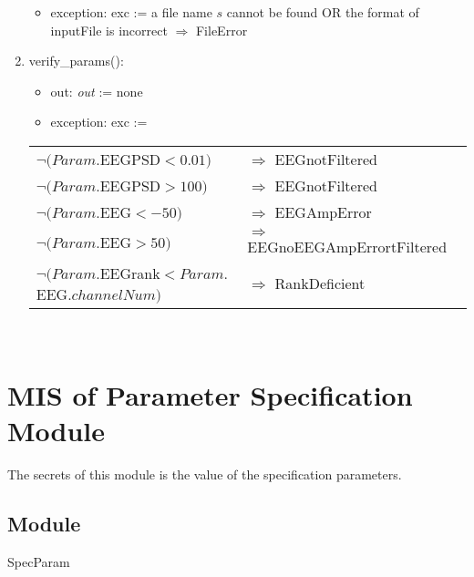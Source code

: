 \documentclass[12pt, titlepage]{article}
\begin{document}
\begin{enumerate}
\begin{itemize}
\item exception: exc := a file name $s$ cannot be found OR the format of
  inputFile is incorrect $\Rightarrow$  FileError
\end{itemize}

\item \noindent verify\_params():
\begin{itemize}
\item out: \textit{out} := none
\item exception: exc := 
\end{itemize}
\noindent \begin{longtable*}[l]{l l} 
$\neg (Param.$EEGPSD$ <0.01)$ & $\Rightarrow$ EEGnotFiltered\\
$\neg (Param.$EEGPSD$ >100)$ & $\Rightarrow$ EEGnotFiltered\\
$\neg (Param.$EEG$ <-50)$ & $\Rightarrow$ EEGAmpError\\
$\neg (Param.$EEG$ >50)$ & $\Rightarrow$ EEGnoEEGAmpErrortFiltered\\
$\neg (Param.$EEGrank$ <Param.$EEG$.channelNum )$ & $\Rightarrow$ RankDeficient\\
\end{longtable*}


\end{enumerate}

%


~\newpage

\section{MIS of Parameter Specification Module } \label{ParamSpec} 

The secrets of this module is the value of the specification parameters.

\subsection{Module}

SpecParam
\end{document}
